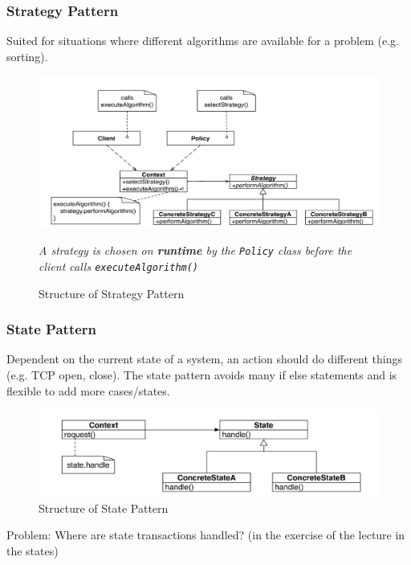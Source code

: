 \subsubsection{Strategy Pattern}
Suited for situations where different algorithms are available for a problem (e.g. sorting).
\begin{figure}[h]
	\centering
	\includegraphics[width=\linewidth]{images/pattern_strategy.png}
	\caption{Structure of Strategy Pattern}{\textit{A strategy is chosen on \textbf{runtime} by the \texttt{Policy} class before the client calls \texttt{executeAlgorithm()}}}
\end{figure}
\newpage

\subsubsection{State Pattern}
Dependent on the current state of a system, an action should do different things (e.g. TCP open, close).
The state pattern avoids many if else statements and is flexible to add more cases/states.
\begin{figure}[h]
	\centering
	\includegraphics[width=\linewidth]{images/pattern_state.png}
	\caption{Structure of State Pattern}
\end{figure}
\newline %
Problem: Where are state transactions handled? (in the exercise of the lecture in the states)
\newpage

